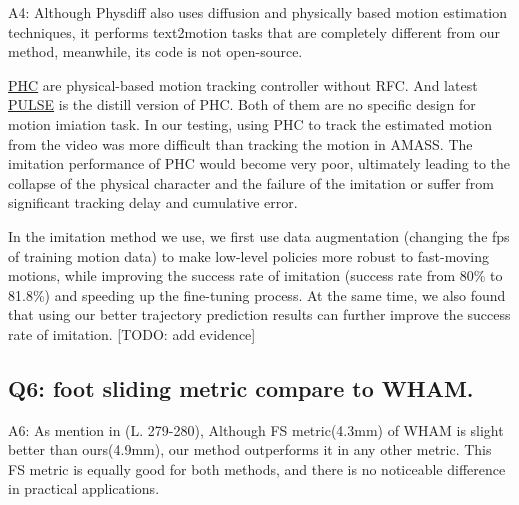 \documentclass{article}
\begin{document}
A4: Although Physdiff also uses diffusion and physically based motion estimation techniques, it performs text2motion tasks that are completely different from our method, meanwhile, its code is not open-source.

\href{https://github.com/ZhengyiLuo/PHC}{PHC} are physical-based motion tracking controller without RFC. And latest \href{https://github.com/ZhengyiLuo/PULSE}{PULSE} is the distill version of PHC. Both of them are no specific design for motion imiation task. In our testing, using PHC to track the estimated motion from the video was more difficult than tracking the motion in AMASS. The imitation performance of PHC would become very poor, ultimately leading to the collapse of the physical character and the failure of the imitation or suffer from significant tracking delay and cumulative error.

In the imitation method we use, we first use data augmentation (changing the fps of training motion data) to make low-level policies more robust to fast-moving motions, while improving the success rate of imitation (success rate from 80\% to 81.8\%) and speeding up the fine-tuning process. At the same time, we also found that using our better trajectory prediction results can further improve the success rate of imitation. {[}TODO: add evidence{]}

\subsection{Q6: foot sliding metric compare to WHAM.}\label{q6-foot-sliding-metric-compare-to-wham.}

A6: As mention in (L. 279-280), Although FS metric(4.3mm) of WHAM is slight better than ours(4.9mm), our method outperforms it in any other metric. This FS metric is equally good for both methods, and there is no noticeable difference in practical applications.
\end{document}
